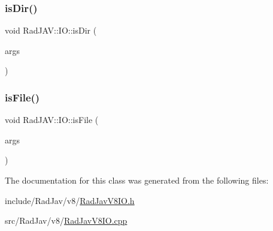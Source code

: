 \mbox{\label{class_rad_j_a_v_1_1_i_o_a559602bb89c785eb95b591aeb94d8869}} 
\subsubsection{\texorpdfstring{is\+Dir()}{isDir()}}
{\footnotesize\ttfamily void Rad\+J\+A\+V\+::\+I\+O\+::is\+Dir (\begin{DoxyParamCaption}\item[{const v8\+::\+Function\+Callback\+Info$<$ v8\+::\+Value $>$ \&}]{args }\end{DoxyParamCaption})\hspace{0.3cm}{\ttfamily [static]}}

\mbox{\label{class_rad_j_a_v_1_1_i_o_a083b7b7d98eb34c8096fe1164c0b1cd7}} 
\subsubsection{\texorpdfstring{is\+File()}{isFile()}}
{\footnotesize\ttfamily void Rad\+J\+A\+V\+::\+I\+O\+::is\+File (\begin{DoxyParamCaption}\item[{const v8\+::\+Function\+Callback\+Info$<$ v8\+::\+Value $>$ \&}]{args }\end{DoxyParamCaption})\hspace{0.3cm}{\ttfamily [static]}}



The documentation for this class was generated from the following files\+:\begin{DoxyCompactItemize}
\item 
include/\+Rad\+Jav/v8/\mbox{\hyperlink{_rad_jav_v8_i_o_8h}{Rad\+Jav\+V8\+I\+O.\+h}}\item 
src/\+Rad\+Jav/v8/\mbox{\hyperlink{_rad_jav_v8_i_o_8cpp}{Rad\+Jav\+V8\+I\+O.\+cpp}}\end{DoxyCompactItemize}
